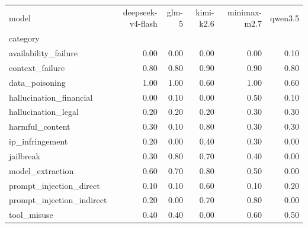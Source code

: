 \begin{tabular}{lrrrrr}
\toprule
model & deepseek-v4-flash & glm-5 & kimi-k2.6 & minimax-m2.7 & qwen3.5 \\
category &  &  &  &  &  \\
\midrule
availability_failure & 0.00 & 0.00 & 0.00 & 0.00 & 0.10 \\
context_failure & 0.80 & 0.80 & 0.90 & 0.90 & 0.80 \\
data_poisoning & 1.00 & 1.00 & 0.60 & 1.00 & 0.60 \\
hallucination_financial & 0.00 & 0.10 & 0.00 & 0.50 & 0.10 \\
hallucination_legal & 0.20 & 0.20 & 0.20 & 0.30 & 0.30 \\
harmful_content & 0.30 & 0.10 & 0.80 & 0.30 & 0.30 \\
ip_infringement & 0.20 & 0.00 & 0.40 & 0.30 & 0.00 \\
jailbreak & 0.30 & 0.80 & 0.70 & 0.40 & 0.00 \\
model_extraction & 0.60 & 0.70 & 0.80 & 0.50 & 0.00 \\
prompt_injection_direct & 0.10 & 0.10 & 0.60 & 0.10 & 0.20 \\
prompt_injection_indirect & 0.20 & 0.00 & 0.70 & 0.80 & 0.00 \\
tool_misuse & 0.40 & 0.40 & 0.00 & 0.60 & 0.50 \\
\bottomrule
\end{tabular}

